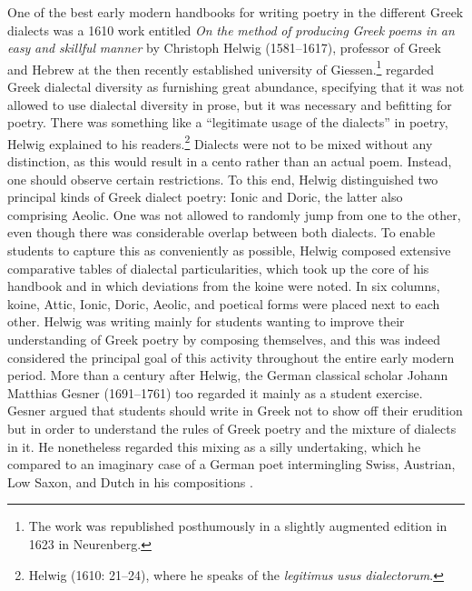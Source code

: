 \documentclass[output=paper]{langsci/langscibook}
\begin{document}
One of the best early modern handbooks for writing poetry in the different Greek dialects was a 1610 work entitled \textit{On} \textit{the} \textit{method} \textit{of} \textit{producing} \textit{Greek} \textit{poems} \textit{in} \textit{an} \textit{easy} \textit{and} \textit{skillful} \textit{manner} by Christoph Helwig (1581–1617), professor of Greek and Hebrew at the then recently established university of Giessen.\footnote{The work was republished posthumously in a slightly augmented edition in 1623 in Neurenberg.} \citet[19]{Helwig1610} regarded Greek dialectal diversity as furnishing great abundance, specifying that it was not allowed to use dialectal diversity in prose, but it was necessary and befitting for poetry. There was something like a “legitimate usage of the dialects” in poetry, Helwig explained to his readers.\footnote{Helwig (1610: 21–24), where he speaks of the \textit{legitimus} \textit{usus} \textit{dialectorum}.} Dialects were not to be mixed without any distinction, as this would result in a cento rather than an actual poem. Instead, one should observe certain restrictions. To this end, Helwig distinguished two principal kinds of Greek dialect poetry: Ionic and Doric, the latter also comprising Aeolic. One was not allowed to randomly jump from one to the other, even though there was considerable overlap between both dialects. To enable students to capture this as conveniently as possible, Helwig composed extensive comparative tables of dialectal particularities, which took up the core of his handbook and in which deviations from the koine were noted. In six columns, koine, Attic, Ionic, Doric, Aeolic, and poetical forms were placed next to each other. Helwig was writing mainly for students wanting to improve their understanding of Greek poetry by composing themselves, and this was indeed considered the principal goal of this activity throughout the entire early modern period. More than a century after Helwig, the German classical scholar Johann Matthias Gesner (1691–1761) too regarded it mainly as a student exercise. Gesner argued that students should write in Greek not to show off their erudition but in order to understand the rules of Greek poetry and the mixture of dialects in it. He nonetheless regarded this mixing as a silly undertaking, which he compared to an imaginary case of a German poet intermingling Swiss, Austrian, Low Saxon, and Dutch in his compositions \citep[162]{Gesner1774}.
\end{document}
